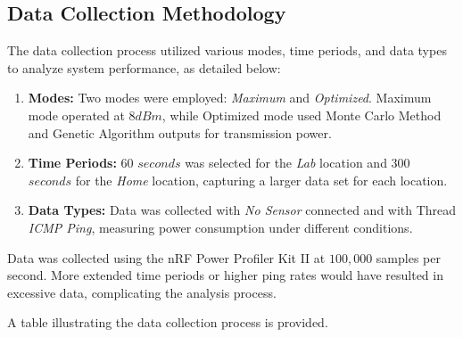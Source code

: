 \subsection{Data Collection Methodology}\label{sec:data_collection_methodology}
The data collection process utilized various modes, time periods, and data types to analyze system performance, as detailed below:

\vspace{2mm}
\begin{enumerate}
    \item \textbf{Modes: }Two modes were employed: \textit{Maximum} and \textit{Optimized}. Maximum mode operated at $8 dBm$, while Optimized mode used Monte Carlo Method and Genetic Algorithm outputs for transmission power.
    \item \textbf{Time Periods:} 60 $seconds$ was selected for the \textit{Lab} location and 300 $seconds$ for the \textit{Home} location, capturing a larger data set for each location.
    \item \textbf{Data Types:} Data was collected with \textit{No Sensor} connected and with Thread \textit{ICMP Ping}, measuring power consumption under different conditions.
\end{enumerate}
\vspace{3mm}

Data was collected using the nRF Power Profiler Kit II at $100,000$ samples per second. More extended time periods or higher ping rates would have resulted in excessive data, complicating the analysis process.

A table illustrating the data collection process is provided.



